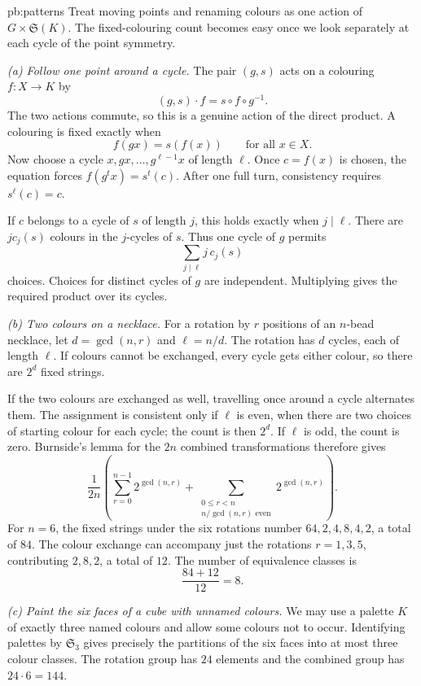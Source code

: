 \begin{solution}{pb:patterns}
\idea Treat moving points and renaming colours as one action of $G\times\mathfrak S(K)$. The fixed-colouring count becomes easy once we look separately at each cycle of the point symmetry.

\writeup \emph{(a) Follow one point around a cycle.}
The pair $(g,s)$ acts on a colouring $f:X\to K$ by
\[
(g,s)\cdot f=s\circ f\circ g^{-1}.
\]
The two actions commute, so this is a genuine action of the direct product. A colouring is fixed exactly when
\[
f(gx)=s(f(x))\qquad\text{for all }x\in X.
\]
Now choose a cycle $x,gx,\ldots,g^{\ell-1}x$ of length $\ell$. Once $c=f(x)$ is chosen, the equation forces $f(g^tx)=s^t(c)$. After one full turn, consistency requires $s^\ell(c)=c$.

If $c$ belongs to a cycle of $s$ of length $j$, this holds exactly when $j\mid\ell$. There are $jc_j(s)$ colours in the $j$-cycles of $s$. Thus one cycle of $g$ permits
\[
\sum_{j\mid\ell}j\,c_j(s)
\]
choices. Choices for distinct cycles of $g$ are independent. Multiplying gives the required product over its cycles.

\emph{(b) Two colours on a necklace.}
For a rotation by $r$ positions of an $n$-bead necklace, let $d=\gcd(n,r)$ and $\ell=n/d$. The rotation has $d$ cycles, each of length $\ell$. If colours cannot be exchanged, every cycle gets either colour, so there are $2^d$ fixed strings.

If the two colours are exchanged as well, travelling once around a cycle alternates them. The assignment is consistent only if $\ell$ is even, when there are two choices of starting colour for each cycle; the count is then $2^d$. If $\ell$ is odd, the count is zero. Burnside's lemma for the $2n$ combined transformations therefore gives
\[
\boxed{\frac1{2n}\left(
\sum_{r=0}^{n-1}2^{\gcd(n,r)}+
\sum_{\substack{0\le r<n\\n/\gcd(n,r)\text{ even}}}
2^{\gcd(n,r)}\right).}
\]
For $n=6$, the fixed strings under the six rotations number
$64,2,4,8,4,2$, a total of $84$. The colour exchange can accompany just the rotations $r=1,3,5$, contributing $2,8,2$, a total of $12$. The number of equivalence classes is
\[
\frac{84+12}{12}=\boxed8.
\]

\emph{(c) Paint the six faces of a cube with unnamed colours.}
We may use a palette $K$ of exactly three named colours and allow some colours not to occur. Identifying palettes by $\mathfrak S_3$ gives precisely the partitions of the six faces into at most three colour classes. The rotation group has $24$ elements and the combined group has $24\cdot6=144$.


\end{solution}
